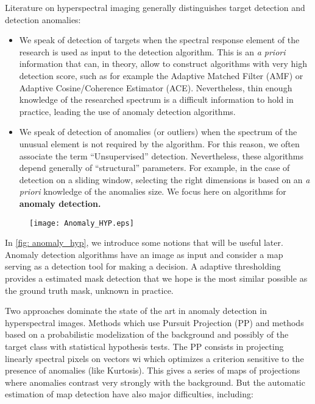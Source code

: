 Literature on hyperspectral imaging
generally distinguishes target detection and detection
anomalies:

\begin{itemize}
\item {We speak of detection of targets when the spectral response
element of the research is used as input to
the detection algorithm. This is an \textit{a priori} information that
can, in theory, allow to construct algorithms with very high
detection score, such as for example the Adaptive Matched Filter (AMF) or Adaptive
Cosine/Coherence Estimator (ACE). Nevertheless,
thin enough knowledge of the researched spectrum is a difficult 
information to hold in practice, leading the use of anomaly detection algorithms.}

\item {We speak of detection of anomalies (or outliers) when the spectrum
  of the unusual element is not required by the algorithm. For this reason, we often associate the term
  ``Unsupervised'' detection. Nevertheless, these algorithms depend
  generally of ``structural'' parameters. For example, in the case
  of detection on a sliding window, selecting the right
  dimensions is based on an \textit{a priori} knowledge of the anomalies size. 
  We focus here on algorithms for \bf{anomaly detection}.}

\end{itemize}
    
\begin{figure}[h]
  \centering
  \texttt{[image: Anomaly\_HYP.eps]}
  \label{fig:anomaly_hyp}
\end{figure}

In \ref{fig: anomaly_hyp}, we introduce some notions that will be useful later. Anomaly detection algorithms have an image as input and consider a map
serving as a detection tool for making a decision. A
adaptive thresholding provides a estimated mask detection that
we hope is the most similar possible as the ground truth mask,
unknown in practice.

Two approaches dominate the state of the art in anomaly detection
in hyperspectral images. Methods which use Pursuit
Projection (PP) and methods based on a probabilistic modelization of the background and possibly of the target class
with statistical hypothesis tests.
The PP consists in projecting linearly spectral pixels on
vectors wi which optimizes a criterion sensitive to the presence of anomalies
(like Kurtosis). This gives a series of maps of projections
where anomalies contrast very strongly with the background. But the automatic estimation of map  detection have also major difficulties, including:

